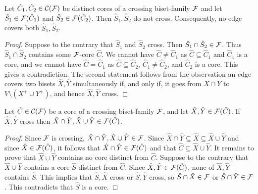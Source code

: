 \begin{lemma} \label{l:HH}
Let $\hat{C}_1,\hat{C}_2 \in {\cal C}({\cal F})$ be distinct cores of a crossing biset-family ${\cal F}$ 
and let $\hat{S}_1 \in {\cal F}(\hat{C}_1)$ and  $\hat{S}_2 \in {\cal F}(\hat{C}_2)$. 
Then $\hat{S}_1,\hat{S}_2$ do not cross. Consequently, no edge covers both $\hat{S}_1,\hat{S}_2$.
\end{lemma}
\begin{proof}
Suppose to the contrary that $\hat{S}_1$ and $\hat{S}_2$ cross.
Then $\hat{S}_1 \cap \hat{S}_2 \in {\cal F}$.
Thus $\hat{S}_1 \cap \hat{S}_2$ contains some ${\cal F}$-core $\hat{C}$.
We cannot have $\hat{C} \neq \hat{C}_1$ as $\hat{C} \subseteq \hat{C}_1$ and $\hat{C}_1$ is a core, and
we cannot have $\hat{C}=\hat{C}_1$      as $\hat{C} \subseteq \hat{C}_2$, $\hat{C}_1 \neq \hat{C}_2$,
and $\hat{C}_2$ is a core. This gives a contradiction. 
The second statement follows from the observation
an edge covers two bisets $\hat{X},\hat{Y}$ simultaneously if, and only if, it goes from 
$X \cap Y$ to $V \setminus (X^+ \cup Y^+)$, and hence $\hat{X},\hat{Y}$ cross.
\end{proof}

\begin{lemma} \label{l:H}
Let $\hat{C} \in {\cal C}({\cal F})$ be a core of a crossing biset-family ${\cal F}$, 
and let $\hat{X}, \hat{Y} \in {\cal F}(\hat{C})$. 
If $\hat{X}, \hat{Y}$ cross then $\hat{X} \cap \hat{Y}, \hat{X} \cup \hat{Y} \in {\cal F}(\hat{C})$.
\end{lemma}
\begin{proof}
Since ${\cal F}$ is crossing, $\hat{X} \cap \hat{Y}, \hat{X} \cup \hat{Y} \in {\cal F}$.
Since $\hat{X} \cap \hat{Y} \subseteq \hat{X} \subseteq \hat{X} \cup \hat{Y}$
and since $\hat{X} \in {\cal F}(\hat{C})$, it follows that $\hat{X} \cap \hat{Y} \in {\cal F}(\hat{C})$
and that $\hat{C} \subseteq \hat{X} \cup \hat{Y}$.
It remains to prove that $\hat{X} \cup \hat{Y}$ contains no core distinct from $\hat{C}$.
Suppose to the contrary that $\hat{X} \cup \hat{Y}$ contains a core $\hat{S}$ distinct from $\hat{C}$.
Since $\hat{X}, \hat{Y} \in {\cal F}(\hat{C})$, none of $\hat{X},\hat{Y}$ contains $\hat{S}$.
This implies that $\hat{S},\hat{X}$ cross or $\hat{S},\hat{Y}$ cross,
so $\hat{S} \cap \hat{X} \in {\cal F}$ or $\hat{S} \cap \hat{Y} \in {\cal F}$.
This contradicts that $\hat{S}$ is a core.
\end{proof}


